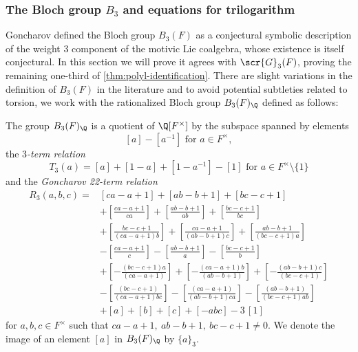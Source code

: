 \documentclass[a4paper]{amsart}
\begin{document}
\subsubsection{The Bloch group $B_3$ and equations for trilogarithm} 
Goncharov defined the Bloch group $B_3(F)$ as a conjectural symbolic description of the weight $3$ component of the motivic Lie coalgebra, whose existence is itself conjectural. In this section we will prove it agrees with $\scr{G}_3(F)$, proving the remaining one-third of \cref{thm:polyl-identification}. There are slight variations in the definition of $B_3(F)$ in the literature and to avoid potential subtleties related to torsion, we work with the rationalized Bloch group $B_3(F)_{\Q}$ defined as follows:

\begin{definition}The group $B_3(F)_{\Q}$  is a quotient of $\Q[F^{\times}]$ by the subspace spanned by elements 
\begin{equation} \label{eqn: 2 term in B3}
[a]-\left[a^{-1}\right] \text{ for }a\in F^{\times},
\end{equation}
the \emph{$3$-term relation} 
\begin{equation}\label{eqn: 3 term in B3}
T_3(a)= [a]+[1-a]+\left[1 - a^{-1}\right]-[1]  \text{ for }a\in F^{\times}\setminus \{1\}
\end{equation}
and the \emph{Goncharov  22-term relation} 
\begin{equation}\label{eqn: 22 term in B3}
\begin{aligned}
R_3(a,b,c) = {} & [ca-a+1]+[ab-b+1]+[bc-c+1]\\
&+ \left[\frac{ca-a+1}{ca}\right]+\left[\frac{ab-b+1}{ab}\right]+\left[\frac{bc-c+1}{bc}\right]\\
&+ \left[\frac{bc-c+1}{(ca-a+1)b}\right]+\left[\frac{ca-a+1}{(ab-b+1)c}\right]+\left[\frac{ab-b+1}{(bc-c+1)a}\right]\\
&- \left[\frac{ca-a+1}{c}\right]-\left[\frac{ab-b+1}{a}\right]-\left[\frac{bc-c+1}{b}\right]\\
&+ \left[-\frac{(bc-c+1)a}{(ca-a+1)}\right]+\left[-\frac{(ca-a+1)b}{(ab-b+1)}\right]+\left[-\frac{(ab-b+1)c}{(bc-c+1)}\right]\\
&-\left[\frac{(bc-c+1)}{(ca-a+1)bc}\right]-\left[\frac{(ca-a+1)}{(ab-b+1)ca}\right]-\left[\frac{(ab-b+1)}{(bc-c+1)ab}\right]\\
& + [a]+[b]+[c]+[-abc]-3 \, [1]
\end{aligned}
\end{equation}
for $a, b, c \in F^{\times}$ such that $ca-a+1,\: ab-b+1,\: bc-c+1\neq 0$. We denote the image of an element $[a]$ in $B_3(F)_{\Q}$ by $\{a\}_3$.\end{definition}
\end{document}
